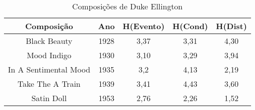 \begin{table}[]
\centering
\caption{Composições de Duke Ellington}
\begin{tabular}{|c|c|c|c|c|}
\hline
\rowcolor[HTML]{9B9B9B} 
{\color[HTML]{FFFFFF} Composição} & {\color[HTML]{FFFFFF} Ano} & {\color[HTML]{FFFFFF} H(Evento)} & {\color[HTML]{FFFFFF} H(Cond)} & {\color[HTML]{FFFFFF} H(Dist)} \\ \hline
Black Beauty                      & 1928                       & 3,37                             & 3,31                           & 4,30                           \\ \hline
Mood Indigo                       & 1930                       & 3,10                             & 3,29                           & 3,94                           \\ \hline
In A Sentimental Mood             & 1935                       & 3,2                              & 4,13                           & 2,19                           \\ \hline
Take The A Train                  & 1939                       & 3,41                             & 4,43                           & 3,60                           \\ \hline
Satin Doll                        & 1953                       & 2,76                             & 2,26                           & 1,52                           \\ \hline
\end{tabular}
\end{table}

